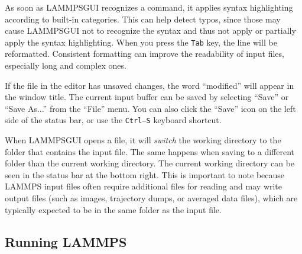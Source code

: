 \documentclass[9pt,tutorial]{livecoms}
\newcommand{\lammpsgui}{\textsf{LAMMPS\textendash GUI}}
\begin{document}
\begin{appendices}
As soon as \lammpsgui{} recognizes a command, it applies syntax
highlighting according to built-in categories.  This can help
detect typos, since those may cause \lammpsgui{} not to
recognize the syntax and thus not apply or partially apply
the syntax highlighting.  When you press the \texttt{Tab} key, the line will be
reformatted.  Consistent formatting can improve the readability of
input files, especially long and complex ones.

If the file in the editor has unsaved changes, the word
``\*modified\*'' will appear in the window title.  The current input
buffer can be saved by selecting ``Save'' or ``Save As...'' from the
``File'' menu.  You can also click the ``Save'' icon on the left side
of the status bar, or use the \texttt{Ctrl--S} keyboard shortcut.

\begin{note}
When \lammpsgui{} opens a file, it will \emph{switch} the working directory
to the folder that contains the input file.  The same happens when saving to
a different folder than the current working directory.  The current working
directory can be seen in the status bar at the bottom right.  This is important
to note because LAMMPS input files often require additional files for reading and may
write output files (such as images, trajectory dumps, or averaged data files),
which are typically expected to be in the same folder as the input file.
\end{note}


\subsection{Running LAMMPS}



\end{appendices}
\end{document}
